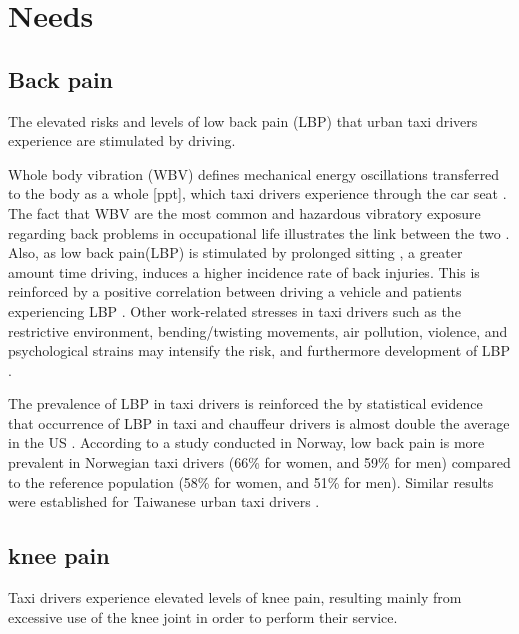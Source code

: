 \documentclass[11pt]{article}
\begin{document}
\section{Needs}
\label{sec:needs}
\subsection{Back pain}
The elevated risks and levels of low back pain (LBP) that urban taxi drivers 
experience are stimulated by driving. 

Whole body vibration (WBV) defines mechanical energy oscillations transferred to 
the body as a whole [ppt], which taxi drivers experience \cite{KneePain, Serious} 
through the car seat \cite{ppt}. The fact that WBV are the most common and hazardous 
vibratory exposure regarding back problems in occupational life illustrates the
link between the two \cite{ODrivers@Risk}. Also, as low back pain(LBP) is stimulated by 
prolonged sitting \cite{Okunribido2008}, a greater amount time driving, induces a 
higher incidence rate of back injuries\cite{Question?}. This is reinforced by a positive 
correlation between driving a vehicle and patients experiencing LBP \cite{ODrivers@Risk}. 
Other work-related stresses in taxi drivers such as the restrictive environment, bending/twisting 
movements, air pollution, violence, and psychological strains may intensify the risk, 
and furthermore development of LBP \cite{KneePain, POSTULATED}. 

The prevalence of LBP in taxi drivers is reinforced the by statistical evidence that occurrence of LBP 
in taxi and chauffeur drivers is almost double the average in the US \cite{68}. According to a study conducted in Norway, low 
back pain is more prevalent in Norwegian taxi drivers (66\% for women, and 59\% for men) 
compared to the reference population (58\% for women, and 51\% for men). Similar results 
were established for Taiwanese urban taxi drivers \cite{Question?}.

 
\subsection{knee pain}
Taxi drivers experience elevated levels of knee pain, resulting mainly from excessive use 
of the knee joint in order to perform their service. 
\end{document}
